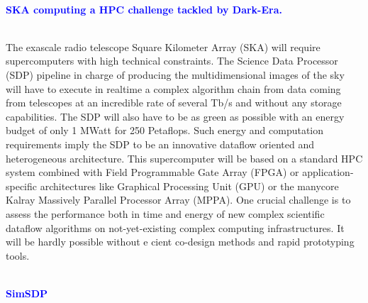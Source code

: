 \documentclass{beamer}
\renewenvironment{block}[1]{%
\begin{Sbox}%
\begin{minipage}[t]{\textwidth}
~\\
\textcolor{blue}{\quad #1}~\\
~\\%
\vspace{0.5cm}
} 
{%
\end{minipage}
\end{Sbox}\Ovalbox{\TheSbox}%
}
\begin{document}
{\begin{columns}[t]
\begin{column}{.49\linewidth}

\begin{block}{\large \textbf{SKA computing a HPC challenge tackled by Dark-Era. }}
        \begin{minipage}{0.95\textwidth}
The exascale radio telescope Square Kilometer Array (SKA) will require supercomputers with high technical constraints. The Science Data Processor (SDP) pipeline in charge of producing the multidimensional images of the sky will have to execute in realtime a complex algorithm chain from data coming from telescopes at an incredible rate of several Tb/s and without any storage capabilities. The SDP will also have to be as green as possible with an energy budget of only 1 MWatt for 250 Petaflops. Such energy and computation requirements imply the SDP to be an innovative dataflow oriented and heterogeneous architecture. This supercomputer will be based on a standard HPC system combined with Field Programmable Gate Array (FPGA) or application-specific architectures like Graphical Processing Unit (GPU) or the manycore Kalray Massively Parallel Processor Array (MPPA). One crucial challenge is to assess the performance both in time and energy of new complex scientific dataflow algorithms on not-yet-existing complex computing infrastructures. It will be hardly possible without e cient co-design methods and rapid prototyping tools.
\end{minipage}
\end{block}

\begin{block}{\large \textbf{SimSDP}}
 

\end{block}
\end{column}
\end{columns}}
\end{document}
